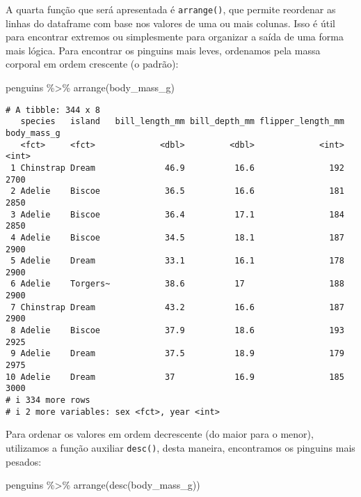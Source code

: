 \documentclass[
  12pt,
  letterpaper,
  DIV=11,
  numbers=noendperiod]{scrreprt}
\newenvironment{Shaded}{\begin{snugshade}}{\end{snugshade}}
\newcommand{\FunctionTok}[1]{\textcolor[rgb]{0.28,0.35,0.67}{#1}}
\newcommand{\NormalTok}[1]{\textcolor[rgb]{0.00,0.23,0.31}{#1}}
\newcommand{\SpecialCharTok}[1]{\textcolor[rgb]{0.37,0.37,0.37}{#1}}
\begin{document}
A quarta função que será apresentada é \texttt{arrange()}, que permite
reordenar as linhas do dataframe com base nos valores de uma ou mais
colunas. Isso é útil para encontrar extremos ou simplesmente para
organizar a saída de uma forma mais lógica. Para encontrar os pinguins
mais leves, ordenamos pela massa corporal em ordem crescente (o padrão):

\begin{Shaded}
\begin{Highlighting}[]
\NormalTok{penguins }\SpecialCharTok{\%\textgreater{}\%} 
  \FunctionTok{arrange}\NormalTok{(body\_mass\_g)}
\end{Highlighting}
\end{Shaded}

\begin{verbatim}
# A tibble: 344 x 8
   species   island   bill_length_mm bill_depth_mm flipper_length_mm body_mass_g
   <fct>     <fct>             <dbl>         <dbl>             <int>       <int>
 1 Chinstrap Dream              46.9          16.6               192        2700
 2 Adelie    Biscoe             36.5          16.6               181        2850
 3 Adelie    Biscoe             36.4          17.1               184        2850
 4 Adelie    Biscoe             34.5          18.1               187        2900
 5 Adelie    Dream              33.1          16.1               178        2900
 6 Adelie    Torgers~           38.6          17                 188        2900
 7 Chinstrap Dream              43.2          16.6               187        2900
 8 Adelie    Biscoe             37.9          18.6               193        2925
 9 Adelie    Dream              37.5          18.9               179        2975
10 Adelie    Dream              37            16.9               185        3000
# i 334 more rows
# i 2 more variables: sex <fct>, year <int>
\end{verbatim}

\noindent Para ordenar os valores em ordem decrescente (do maior para o
menor), utilizamos a função auxiliar \texttt{desc()}, desta maneira,
encontramos os pinguins mais pesados:

\begin{Shaded}
\begin{Highlighting}[]
\NormalTok{penguins }\SpecialCharTok{\%\textgreater{}\%} 
  \FunctionTok{arrange}\NormalTok{(}\FunctionTok{desc}\NormalTok{(body\_mass\_g))}
\end{Highlighting}
\end{Shaded}
\end{document}
